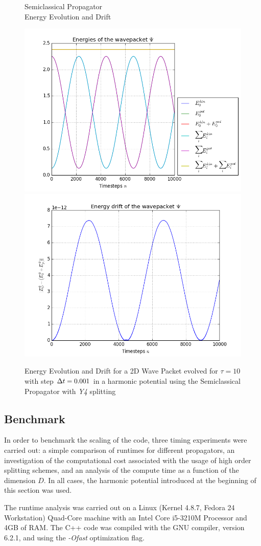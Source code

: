 \begin{figure}
	\begin{minipage}[c]{\textwidth}
		\begin{center}
			\large Semiclassical Propagator \\[1mm]
			\normalsize Energy Evolution and Drift
			\vspace{4mm}
		\end{center}
	\end{minipage}
	\includegraphics[width=.45\textwidth]{figures/energy_Semiclassical.png}
	\includegraphics[width=.45\textwidth]{figures/drift_Semiclassical.png}
	\label{fig:energy_Semiclassical}
	\caption{Energy Evolution and Drift for a 2D Wave Packet evolved for $\tau = 10$ with step $\Delta t = 0.001$ in a harmonic potential using the Semiclassical Propagator with \emph{Y4} splitting}
\end{figure}

\subsection{Benchmark}
%
In order to benchmark the scaling of the code, three timing experiments were carried out: a simple comparison of runtimes for different propagators, an investigation of the computational cost associated with the usage of high order splitting schemes, and an analysis of the compute time as a function of the dimension $D$.
In all cases, the harmonic potential introduced at the beginning of this section was used.
\par\medskip
%
The runtime analysis was carried out on a Linux (Kernel 4.8.7, Fedora 24 Workstation) Quad-Core machine with an Intel Core i5-3210M Processor and
4GB of RAM. The C++ code was compiled with the GNU compiler, version 6.2.1, and using the \emph{-Ofast} optimization flag.




